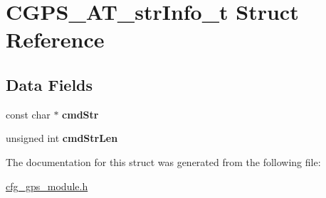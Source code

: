 \hypertarget{struct_c_g_p_s___a_t__str_info__t}{}\section{C\+G\+P\+S\+\_\+\+A\+T\+\_\+str\+Info\+\_\+t Struct Reference}
\label{struct_c_g_p_s___a_t__str_info__t}
\subsection*{Data Fields}
\begin{DoxyCompactItemize}
\item 
\mbox{\label{struct_c_g_p_s___a_t__str_info__t_ac1fcd2757150ff39f88b3f1ce8a78a88}} 
const char $\ast$ {\bfseries cmd\+Str}
\item 
\mbox{\label{struct_c_g_p_s___a_t__str_info__t_aa629f7f6db9f3068f362fed94afff2c8}} 
unsigned int {\bfseries cmd\+Str\+Len}
\end{DoxyCompactItemize}


The documentation for this struct was generated from the following file\+:\begin{DoxyCompactItemize}
\item 
\hyperlink{cfg__gps__module_8h}{cfg\+\_\+gps\+\_\+module.\+h}\end{DoxyCompactItemize}
